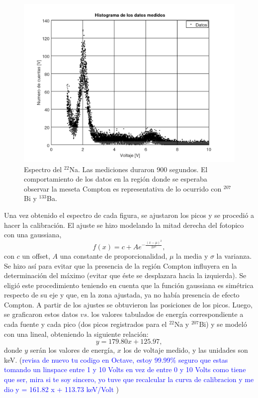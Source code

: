 \documentclass[twoside]{article}
\begin{document}
\begin{multicols}{2}
\begin{figure}[H]
    \centering
    \includegraphics[scale=0.4]{sodio.png}
    \caption{Espectro del $^{22}$Na. Las mediciones duraron 900 segundos. El comportamiento de los datos en la región donde se esperaba observar la meseta Compton es representativa de lo ocurrido con $^{207}$Bi y $^{133}$Ba.}
    \label{sodio}
\end{figure}


Una vez obtenido el espectro de cada figura, se ajustaron los picos y se procedió a hacer la calibración. El ajuste se hizo modelando la mitad derecha del fotopico con una gaussiana,
\begin{equation}
    f(x) =  c + A e^{-\frac{(x - \mu)^2}{2\sigma^2}},
\end{equation}
con $c$ un offset, $A$ una constante de proporcionalidad, $\mu$ la media y $\sigma$ la varianza. Se hizo así para evitar que la presencia de la región Compton influyera en la determinación del máximo (evitar que éste se desplazara hacia la izquierda). Se eligió este procedimiento teniendo en cuenta que la función gaussiana es simétrica respecto de su eje y que, en la zona ajustada, ya no había presencia de efecto Compton. A partir de los ajustes se obtuvieron las posiciones de los picos. Luego, se graficaron estos datos $vs.$ los valores tabulados de energía correspondiente a cada fuente y cada pico (dos picos registrados para el $^{22}$Na y $^{207}$Bi) y se modeló con una lineal, obteniendo la siguiente relación: 
\begin{equation}
    y = 179.80 x + 125.97,
\end{equation}
donde $y$ serán los valores de energía, $x$ los de voltaje medido, y las unidades son keV. (\textcolor{Blue}{revisa de nuevo tu codigo en Octave, estoy 99.99\% seguro que estas tomando un linspace entre 1 y 10 Volts en vez de entre 0 y 10 Volts como tiene que ser, mira si te soy sincero, yo tuve que recalcular la curva de calibracion y me dio y = 161.82 x + 113.73  keV/Volt} )



\end{multicols}
\end{document}
